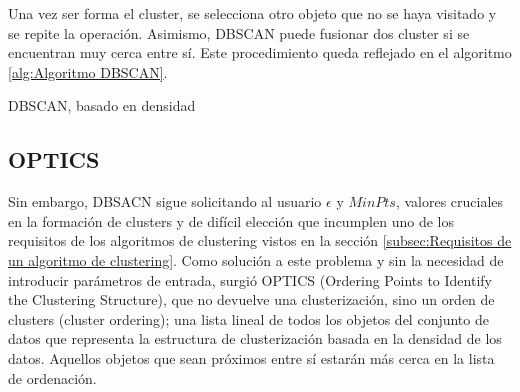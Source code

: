 \documentclass[10pt, a4paper]{article}
\begin{document}
Una vez ser forma el cluster, se selecciona otro objeto que no se haya visitado y se repite la operación. Asimismo, DBSCAN puede fusionar dos cluster si se encuentran muy cerca entre sí. Este procedimiento queda reflejado en el algoritmo \ref{alg:Algoritmo DBSCAN}.



\begin{algorithm}[!ht]
\SetAlgoLined
  \LinesNumbered
  \DontPrintSemicolon
  \caption{DBSCAN, basado en densidad}
  \label{alg:Algoritmo DBSCAN}
\end{algorithm}




\subsection{\textbf{OPTICS}} \label{subsec:optics}

Sin embargo, DBSACN sigue solicitando al usuario $\epsilon$ y $MinPts$, valores cruciales en la formación de clusters y de difícil elección que incumplen uno de los requisitos de los algoritmos de clustering vistos en la sección \ref{subsec:Requisitos de un algoritmo de clustering}. Como solución a este problema y sin la necesidad de introducir parámetros de entrada, surgió OPTICS (Ordering Points to Identify the Clustering Structure), que no devuelve una clusterización, sino un orden de clusters (cluster ordering); una lista lineal de todos los objetos del conjunto de datos que representa la estructura de clusterización basada en la densidad de los datos. Aquellos objetos que sean próximos entre sí estarán más cerca en la lista de ordenación.
\end{document}
